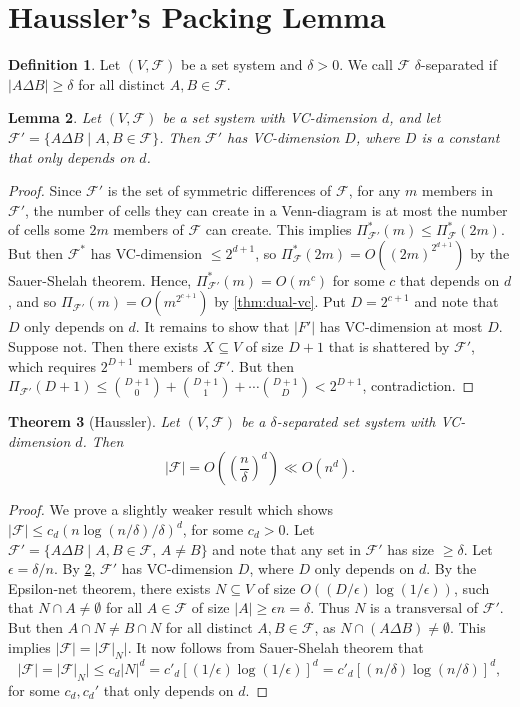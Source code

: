 \documentclass[12pt,reqno]{amsart}
\newtheorem{theorem}{Theorem}[section]
\newtheorem{lemma}[theorem]{Lemma}
\theoremstyle{definition}
\newtheorem{definition}[theorem]{Definition}
\theoremstyle{remark}
\renewcommand{\leq}{\leqslant}
\renewcommand{\geq}{\geqslant}
\def\F{\mathcal{F}}
\numberwithin{equation}{section}
\begin{document}
\newpage

\section{Haussler's Packing Lemma}

\begin{definition}
	Let $(V, \F)$ be a set system and $\delta > 0$. We call $\F$ $\delta$-separated if $|A \Delta B| \geq \delta$ for all distinct $A, B \in \F$.
\end{definition}

\begin{lemma}\label{lem:haussler}
	Let $(V, \F)$ be a set system with VC-dimension $d$, and let $\F' = \{A \Delta B \mid A, B \in \F\}$. Then $\F'$ has VC-dimension $D$, where $D$ is a constant that only depends on $d$.
\end{lemma}

\begin{proof}
	Since $\F'$ is the set of symmetric differences of $\F$, for any $m$ members in $\F'$, the number of cells they can create in a Venn-diagram is at most the number of cells some $2m$ members of $\F$ can create. This implies $\Pi_{\F'}^*(m) \leq \Pi_\F^*(2m)$. But then $\F^*$ has VC-dimension $\leq 2^{d + 1}$, so $\Pi_\F^*(2m) = O((2m)^{2^{d + 1}})$ by the Sauer-Shelah theorem. Hence, $\Pi_{\F'}^*(m) = O(m^{c})$ for some $c$ that depends on $d$, and so $\Pi_{\F'}(m) = O(m^{2^{c + 1}})$ by \cref{thm:dual-vc}. Put $D = 2^{c + 1}$ and note that $D$ only depends on $d$. It remains to show that $|F'|$ has VC-dimension at most $D$. Suppose not. Then there exists $X \subseteq V$ of size $D + 1$ that is shattered by $\F'$, which requires $2^{D + 1}$ members of $\F'$. But then $\Pi_{\F'}(D + 1) \leq \binom{D + 1}{0} + \binom{D + 1}{1} + \cdots \binom{D + 1}{D} < 2^{D + 1}$, contradiction.
\end{proof}

\begin{theorem}[Haussler]
	Let $(V, \F)$ be a $\delta$-separated set system with VC-dimension $d$. Then 
	\[
		|\F| = O\left(\left(\frac{n}{\delta}\right)^d\right) \ll O(n^d).
	\]
\end{theorem}

\begin{proof}
	We prove a slightly weaker result which shows $|\F| \leq c_d(n\log(n/\delta)/\delta)^d$, for some $c_d > 0$. Let $\F' = \{A \Delta B \mid A, B \in \F, \, A \neq B\}$ and note that any set in $\F'$ has size $\geq \delta$. Let $\epsilon = \delta/n$. By \cref{lem:haussler}, $\F'$ has VC-dimension $D$, where $D$ only depends on $d$. By the Epsilon-net theorem, there exists $N \subseteq V$ of size $O((D/\epsilon)\log(1/\epsilon))$, such that $N \cap A \neq \emptyset$ for all $A \in \F$ of size $|A| \geq \epsilon n = \delta$. Thus $N$ is a transversal of $\F'$. But then $A \cap N \neq B \cap N$ for all distinct $A, B \in \F$, as $N \cap (A \Delta B) \neq \emptyset$. This implies $|\F| = |\F|_N|$. It now follows from Sauer-Shelah theorem that
	\[
		|\F| = |\F|_N| \leq c_d|N|^d = c'_d[(1/\epsilon)\log(1/\epsilon)]^d = c'_d[(n/\delta)\log(n/\delta)]^d,
	\] 
	for some $c_d, c_d'$ that only depends on $d$.
\end{proof}
\end{document}
